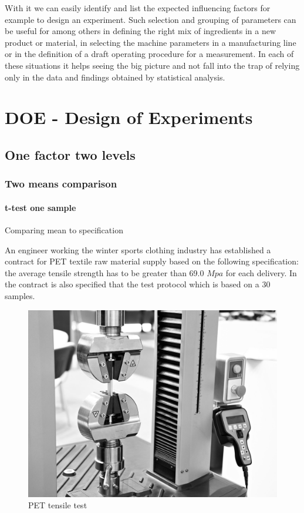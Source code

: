 \documentclass[
]{book}
\begin{document}
With it we can easily identify and list the expected influencing factors for example to design an experiment. Such selection and grouping of parameters can be useful for among others in defining the right mix of ingredients in a new product or material, in selecting the machine parameters in a manufacturing line or in the definition of a draft operating procedure for a measurement. In each of these situations it helps seeing the big picture and not fall into the trap of relying only in the data and findings obtained by statistical analysis.

\hypertarget{DOE}{%
\chapter{DOE - Design of Experiments}\label{DOE}}

\hypertarget{one-factor-two-levels}{%
\section{One factor two levels}\label{one-factor-two-levels}}

\hypertarget{two-means-comparison}{%
\subsection{Two means comparison}\label{two-means-comparison}}

\hypertarget{tTest}{%
\subsubsection{t-test one sample}\label{tTest}}

Comparing mean to specification

An engineer working the winter sports clothing industry has established a contract for PET textile raw material supply based on the following specification: the average tensile strength has to be greater than 69.0 \(Mpa\) for each delivery. In the contract is also specified that the test protocol which is based on a 30 samples.

\begin{figure}

{\centering \includegraphics[width=0.6\linewidth]{img/tensile_test_bw} 

}

\caption{PET tensile test}\label{fig:unnamed-chunk-2}
\end{figure}
\end{document}
